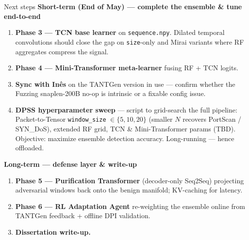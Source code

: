 \documentclass[10pt,aspectratio=169]{beamer}
\begin{document}
\begin{frame}{Next steps}
\textbf{Short-term (End of May) --- complete the ensemble \& tune end-to-end}
\begin{enumerate}\scriptsize
  \item \textbf{Phase 3 --- TCN base learner} on \texttt{sequence.npy}.
        Dilated temporal convolutions should close the gap on \texttt{size}-only
        and Mirai variants where RF aggregates compress the signal.
  \item \textbf{Phase 4 --- Mini-Transformer meta-learner} fusing RF + TCN logits.
  \item \textbf{Sync with In\^es} on the TANTGen version in use --- confirm whether
        the Fuzzing snaplen-200B no-op is intrinsic or a fixable config issue.
  \item \textbf{DPSS hyperparameter sweep} --- script to grid-search the full pipeline:
        Packet-to-Tensor \texttt{window\_size} $\in \{5,10,20\}$ (smaller $N$ recovers
        PortScan / SYN\_DoS), extended RF grid, TCN \& Mini-Transformer params (TBD).
        Objective: maximize ensemble detection accuracy. Long-running --- hence offloaded.
\end{enumerate}

\textbf{Long-term --- defense layer \& write-up}
\begin{enumerate}\scriptsize\setcounter{enumi}{4}
  \item \textbf{Phase 5 --- Purification Transformer} (decoder-only Seq2Seq) projecting
        adversarial windows back onto the benign manifold; KV-caching for latency.
  \item \textbf{Phase 6 --- RL Adaptation Agent} re-weighting the ensemble online
        from TANTGen feedback + offline DPI validation.
  \item \textbf{Dissertation write-up.}
\end{enumerate}
\end{frame}
\end{document}
